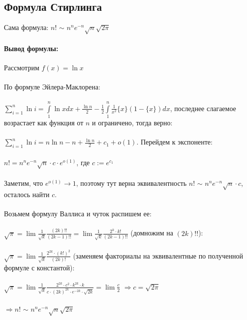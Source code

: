 \documentclass[../main.tex]{subfiles}
\begin{document}
\newpage


\subsection{Формула Стирлинга}
Сама формула: $n!$ $\mathtt{\sim}$  ${n}^{n} {e}^{-n} \sqrt{n} \sqrt{2\pi}$ \\\\
\textbf{Вывод формулы:} \\\\
Рассмотрим $f(x) = \ln{x}$ \\\\
По формуле Эйлера-Маклорена:\\\\
$\sum\limits_{i=1}^{n} {\ln{i}} = \int\limits_{1}^{n} {\ln{x}dx} + \frac{\ln{n}}{2} - \frac{1}{2} \int\limits_{1}^{n} {\frac{1}{{x}^{2}} \{x\}(1-\{x\})dx}$, последнее слагаемое возрастает как функция от $n$ и ограничено, тогда верно: \\\\
$\sum\limits_{i=1}^{n} {\ln{i}} = n\ln{n} - n + \frac{\ln{n}}{2} + c_1 + o(1)$. Перейдем к экспоненте: \\\\
$n! = {n}^{n} {e}^{-n} \sqrt{n}\cdot c \cdot {e}^{o(1)}$, где $c := {e}^{c_1}$ \\\\
Заметим, что ${e}^{o(1)} \rightarrow 1$, поэтому тут верна эквивалентность $n!$ $\mathtt{\sim}$  ${n}^{n} {e}^{-n} \sqrt{n} \cdot c$, осталось найти $c$. \\\\
Возьмем формулу Валлиса и чуток распишем ее: \\\\
$\sqrt{\pi} = \lim{\frac{1}{\sqrt{k}} \frac{(2k)!!}{(2k - 1)!!}} = \lim{\frac{1}{\sqrt{k}} \frac{{2}^{k}\cdot{k!}}{(2k - 1)!!}}$ (домножим на $(2k)!!$):\\\\
$\sqrt{\pi} = \lim{\frac{1}{\sqrt{k}} \frac{{2}^{2k}\cdot {(k!)}^{2}}{(2k)!}}$ (заменяем факториалы на эквивалентные по полученной формуле с константой): \\\\
$\sqrt{\pi} = \lim{\frac{1}{\sqrt{k}} \frac{{2}^{2k}\cdot{c}^{2}\cdot{k}^{2k}\cdot k}{c\cdot{(2k)^{2k}\cdot{e}^{-2k}\cdot\sqrt{2k}}}} = \lim{\frac{c}{2}}$
$\Rightarrow c = \sqrt{2\pi}$\\\\
$\Rightarrow n!$ $\mathtt{\sim}$  ${n}^{n} {e}^{-n} \sqrt{n} \sqrt{2\pi}$
\newpage
\end{document}

